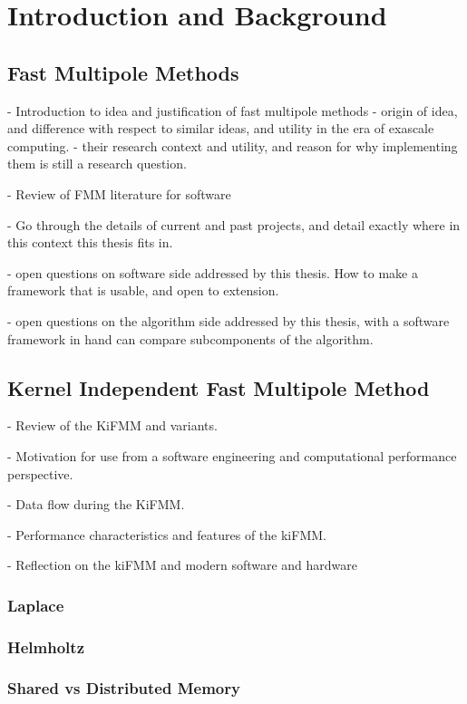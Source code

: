 \chapter{Introduction and Background}\label{chpt:introduction}
\thispagestyle{chaptertitle} %


\section{Fast Multipole Methods}


- Introduction to idea and justification of fast multipole methods
- origin of idea, and difference with respect to similar ideas, and utility in the era of exascale computing.
- their research context and utility, and reason for why implementing them is still a research question.

- Review of FMM literature for software

- Go through the details of current and past projects, and detail exactly where in this context this thesis fits in.

- open questions on software side addressed by this thesis. How to make a framework that is usable, and open to extension.

- open questions on the algorithm side addressed by this thesis, with a software framework in hand can compare subcomponents of the algorithm.

\section{Kernel Independent Fast Multipole Method}

- Review of the KiFMM and variants.

- Motivation for use from a software engineering and computational performance perspective.

- Data flow during the KiFMM.

- Performance characteristics and features of the kiFMM.

- Reflection on the kiFMM and modern software and hardware

\subsection{Laplace}

\subsection{Helmholtz}

\subsection{Shared vs Distributed Memory}